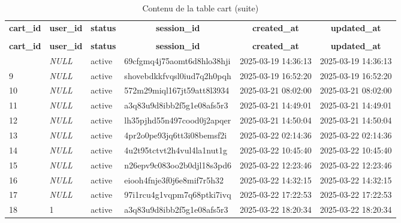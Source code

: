 %
%
 \begin{longtable}{|l|l|l|l|l|l|} 
 \hline \endhead \hline \endfoot \hline 
 \caption{Contenu de la table cart} \label{tab:cart-data} \\\hline \multicolumn{1}{|c|}{\textbf{cart\_id}} & \multicolumn{1}{|c|}{\textbf{user\_id}} & \multicolumn{1}{|c|}{\textbf{status}} & \multicolumn{1}{|c|}{\textbf{session\_id}} & \multicolumn{1}{|c|}{\textbf{created\_at}} & \multicolumn{1}{|c|}{\textbf{updated\_at}} \\ \hline \hline  \endfirsthead 
\caption{Contenu de la table cart (suite)} \\ \hline \multicolumn{1}{|c|}{\textbf{cart\_id}} & \multicolumn{1}{|c|}{\textbf{user\_id}} & \multicolumn{1}{|c|}{\textbf{status}} & \multicolumn{1}{|c|}{\textbf{session\_id}} & \multicolumn{1}{|c|}{\textbf{created\_at}} & \multicolumn{1}{|c|}{\textbf{updated\_at}} \\ \hline \hline \endhead \endfoot
8 & \textit{NULL} & active & 69cfgmq4j75aomt6d8hlo38hji & 2025-03-19 14:36:13 & 2025-03-19 14:36:13 \\ \hline 
9 & \textit{NULL} & active & shovebdkkfvqsl0iud7q2h0pqh & 2025-03-19 16:52:20 & 2025-03-19 16:52:20 \\ \hline 
10 & \textit{NULL} & active & 572m29miql167jt59att8l3934 & 2025-03-21 08:02:00 & 2025-03-21 08:02:00 \\ \hline 
11 & \textit{NULL} & active & a3q83u9d8ibb2f5g1e08afs5r3 & 2025-03-21 14:49:01 & 2025-03-21 14:49:01 \\ \hline 
12 & \textit{NULL} & active & lh35pjhd55n497cood0j2apqer & 2025-03-21 14:50:04 & 2025-03-21 14:50:04 \\ \hline 
13 & \textit{NULL} & active & 4pr2o0pe93jq6tt3i08bemsf2i & 2025-03-22 02:14:36 & 2025-03-22 02:14:36 \\ \hline 
14 & \textit{NULL} & active & 4u2t95tctvt2h4vul4la1nut1g & 2025-03-22 10:45:40 & 2025-03-22 10:45:40 \\ \hline 
15 & \textit{NULL} & active & n26epv9c083oo2b0djl18s3pd6 & 2025-03-22 12:23:46 & 2025-03-22 12:23:46 \\ \hline 
16 & \textit{NULL} & active & eiooh4fnje3f0j6e8mif7r5h32 & 2025-03-22 14:32:15 & 2025-03-22 14:32:15 \\ \hline 
17 & \textit{NULL} & active & 97i1rcu4g1vqpm7q68ptki7ivq & 2025-03-22 17:22:53 & 2025-03-22 17:22:53 \\ \hline 
18 & 1 & active & a3q83u9d8ibb2f5g1e08afs5r3 & 2025-03-22 18:20:34 & 2025-03-22 18:20:34 \\ \hline 

\end{longtable}
